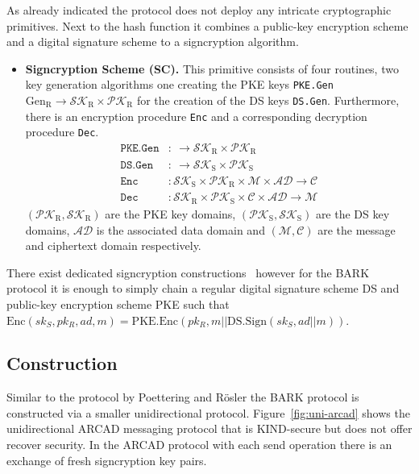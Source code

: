 \documentclass[11pt,a4paper,twoside,openright,bibliography=totoc]{scrbook}
\renewcommand{\t}{\text} %
\begin{document}
As already indicated the protocol does not deploy any intricate
cryptographic primitives. Next to the hash function it combines a
public-key encryption scheme and a digital signature scheme to
a signcryption algorithm.
\begin{itemize}
\item \textbf{Signcryption Scheme (SC).} This primitive consists of four routines,
  two key generation algorithms one creating the PKE keys \texttt{PKE.Gen}
  $\t{Gen}_\t{R} \rightarrow \mathcal{SK}_\t{R} \times \mathcal{PK}_\t{R}$
  for the creation of the DS keys \texttt{DS.Gen}. Furthermore,
  there is an encryption procedure \texttt{Enc} and a corresponding
  decryption procedure \texttt{Dec}.
  \begin{align*}
    \texttt{PKE.Gen} & : \ \rightarrow \mathcal{SK}_\t{R} \times \mathcal{PK}_\t{R} \\
    \texttt{DS.Gen} & : \ \rightarrow \mathcal{SK}_\t{S} \times \mathcal{PK}_\t{S} \\
    \texttt{Enc} & : \mathcal{SK}_\t{S} \times \mathcal{PK}_\t{R} \times \mathcal{M} \times
                   \mathcal{AD} \rightarrow \mathcal{C} \\
    \texttt{Dec} & : \mathcal{SK}_\t{R} \times \mathcal{PK}_\t{S} \times
  \mathcal{C} \times \mathcal{AD} \rightarrow \mathcal{M}
  \end{align*}
  $(\mathcal{PK}_\t{R},\mathcal{SK}_\t{R})$ are the PKE key domains,
  $(\mathcal{PK}_\t{S},\mathcal{SK}_\t{S})$ are the DS key domains, $\mathcal{AD}$
  is the associated data domain and $(\mathcal{M}, \mathcal{C})$ are
  the message and ciphertext domain respectively.
\end{itemize}

There exist dedicated signcryption constructions~\cite{zheng1997digital}
however for the BARK protocol
it is enough to simply chain a regular digital signature scheme DS and
public-key encryption scheme PKE
such that $\t{Enc}(sk_S,pk_R,ad,m) = \t{PKE.Enc}(pk_R,m || \t{DS.Sign}(sk_S,ad || m))$.

\subsection{Construction}
\label{sec:construction-2}

Similar to the protocol by Poettering and Rösler the BARK protocol is
constructed via a smaller unidirectional protocol. Figure~\ref{fig:uni-arcad}
shows the unidirectional ARCAD messaging protocol that is KIND-secure but
does not offer recover security. In the ARCAD protocol with each send operation
there is an exchange of fresh signcryption key pairs.
\end{document}

